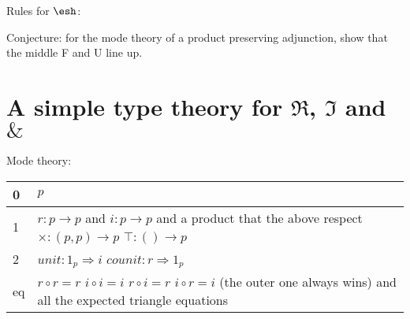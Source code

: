 \documentclass[a4paper,12pt]{article}
\newcommand{\yields}{\vdash}
\newcommand{\cbar}{\, | \,}
\newcommand{\Red}{\Re}
\newcommand{\Cored}{\Im}
\newcommand{\Wat}{\&}
\newcommand{\shape}{\ensuremath{\mathord{\raisebox{0.5pt}{\text{\rm\esh}}}}}
\begin{document}
Rules for $\shape$: 

Conjecture: for the mode theory of a product preserving adjunction, show that the middle F and U line up.

\newpage
\section{A simple type theory for $\Red$, $\Cored$ and $\Wat$}
\label{sec:differential}

Mode theory:
\begin{center}
  \begin{tabular}{| l | l |}
    \hline
    0 & $p$ \\
    \hline
    1 & \pbox{20cm}{
      $r : p \to p$ and $i : p \to p$ \\
      and a product that the above respect \\
      $\times : (p, p) \to p$ \hspace{2ex} $\top : () \to p$
    }\\
    \hline
    2 & $unit : 1_p \Rightarrow i$ \hspace{2ex} $counit : r \Rightarrow 1_p$ \\
    \hline
     eq & \pbox{20cm}{\vspace{1ex}
       $r \circ r = r$ \\
       $i \circ i = i$ \\
       $r \circ i = r$ \\
       $i \circ r = i$ \\
       (the outer one always wins) \\
       and all the expected triangle equations
    }\\
    \hline
  \end{tabular}
\end{center}
\end{document}
